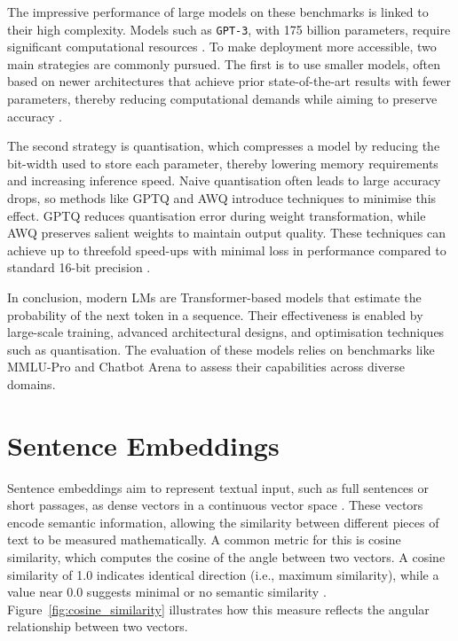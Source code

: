 \documentclass[a4paper,oneside,bibliography=totoc]{scrbook}
\begin{document}
The impressive performance of large models on these benchmarks is linked to their high complexity. Models such as \texttt{GPT-3}, with 175 billion parameters, require significant computational resources \cite{Brown2020,Frantar2023}. To make deployment more accessible, two main strategies are commonly pursued. The first is to use smaller models, often based on newer architectures that achieve prior state-of-the-art results with fewer parameters, thereby reducing computational demands while aiming to preserve accuracy \cite{Grattafiori2024,Meta2024}.

The second strategy is quantisation, which compresses a model by reducing the bit-width used to store each parameter, thereby lowering memory requirements and increasing inference speed. Naive quantisation often leads to large accuracy drops, so methods like GPTQ and AWQ introduce techniques to minimise this effect. GPTQ reduces quantisation error during weight transformation, while AWQ preserves salient weights to maintain output quality. These techniques can achieve up to threefold speed-ups with minimal loss in performance compared to standard 16-bit precision \cite{Frantar2023,Lin2024}.

In conclusion, modern \acp{LM} are Transformer-based models that estimate the probability of the next token in a sequence. Their effectiveness is enabled by large-scale training, advanced architectural designs, and optimisation techniques such as quantisation. The evaluation of these models relies on benchmarks like MMLU-Pro and Chatbot Arena to assess their capabilities across diverse domains.

\section{Sentence Embeddings}
\label{sec:sentence_embeddings}

Sentence embeddings aim to represent textual input, such as full sentences or short passages, as dense vectors in a continuous vector space \cite{Singhal2001}. These vectors encode semantic information, allowing the similarity between different pieces of text to be measured mathematically. A common metric for this is cosine similarity, which computes the cosine of the angle between two vectors. A cosine similarity of 1.0 indicates identical direction (i.e., maximum similarity), while a value near 0.0 suggests minimal or no semantic similarity \cite{Singhal2001}. Figure~\ref{fig:cosine_similarity} illustrates how this measure reflects the angular relationship between two vectors.
\end{document}
